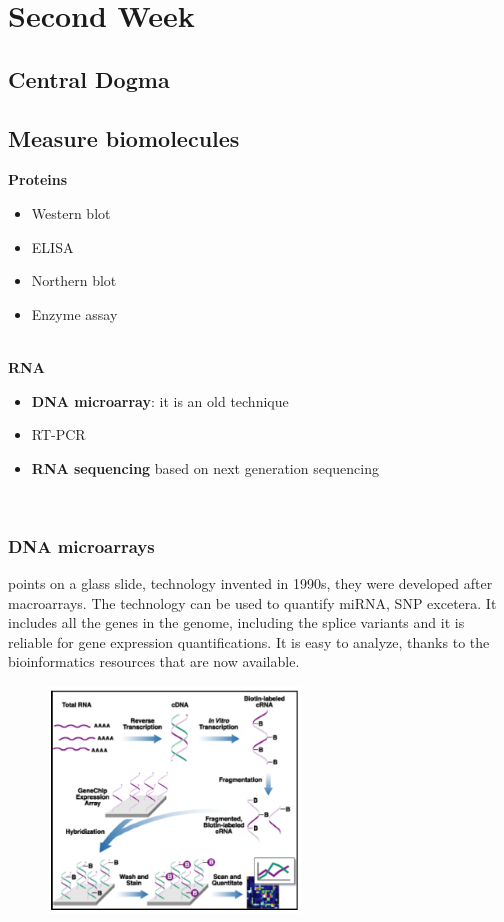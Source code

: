 \graphicspath{{chapters/images/02/}}

\chapter{Second Week}

\section{Central Dogma}

\section{Measure biomolecules}
\textbf{Proteins}
\begin{itemize}
	\item Western blot
	\item ELISA
	\item Northern blot
	\item Enzyme assay
\end{itemize}\\


\textbf{RNA}
\begin{itemize}
	\item \textbf{DNA microarray}: it is an old technique
	\item RT-PCR
	\item \textbf{RNA sequencing} based on next generation sequencing  
\end{itemize}\\

\subsection{DNA microarrays}
points on a glass slide, technology invented in 1990s, they were developed after macroarrays.
The technology can be used to quantify miRNA, SNP excetera. It includes all the genes in the genome, including the splice variants and it is reliable for gene expression quantifications. It is easy to analyze, thanks to the bioinformatics resources that are now available.

\begin{figure}[h]
\caption{}
\centering
\includegraphics[width=0.6\textwidth]{microarrays}
\end{figure}

